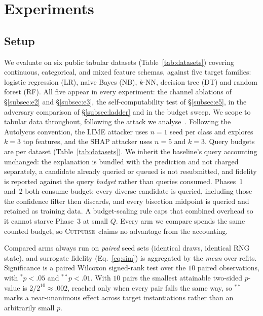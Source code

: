 \documentclass[sigconf,anonymous,review]{acmart}
\newcommand{\sys}{\textsc{Cutpurse}}
\begin{document}
\section{Experiments}
\label{sec:experiments}
\subsection{Setup}
\label{subsec:setup}
We evaluate on six public tabular datasets (Table~\ref{tab:datasets}) covering continuous,
categorical, and mixed feature schemas, against five target families: logistic regression (LR), naive
Bayes (NB), $k$-NN, decision tree (DT) and random forest (RF). All five appear in every experiment: the channel
ablations of \S\ref{subsec:e2} and \S\ref{subsec:e3}, the self-computability test of
\S\ref{subsec:e5}, in the adversary comparison of \S\ref{subsec:ladder} and in the budget sweep. We scope to tabular data throughout,
following the attack we analyse~\cite{oksuz2024autolycus}. Following the Autolycus convention, the
LIME attacker uses $n{=}1$
seed per class and explores $k{=}3$ top features, and the SHAP attacker uses $n{=}5$ and $k{=}3$.
Query budgets are per dataset (Table~\ref{tab:datasets}). We inherit the baseline's query
accounting unchanged: the explanation is bundled with the prediction and not charged separately, a
candidate already queried or queued is not resubmitted, and fidelity is reported against the query
\emph{budget} rather than queries consumed. Phases~1 and~2 both consume budget: every diverse
candidate is queried, including those the confidence filter then discards, and every bisection
midpoint is queried and retained as training data. A budget-scaling rule caps that combined overhead
so it cannot starve Phase~3 at small $Q$. Every arm we compare spends the same counted budget, so
\sys\ claims no advantage from the accounting.

Compared arms always run on \emph{paired} seed sets (identical draws, identical RNG state), and
surrogate fidelity (Eq.~\ref{eq:sim}) is aggregated by the \emph{mean} over refits. Significance is a
paired Wilcoxon signed-rank test over the $10$ paired observations, with $^{*}p{<}.05$ and
$^{**}p{<}.01$. With $10$ pairs the smallest attainable two-sided $p$-value is $2/2^{10}\approx.002$,
reached only when every pair falls the same way, so $^{**}$ marks a near-unanimous effect across
target instantiations rather than an arbitrarily small $p$.
\end{document}

